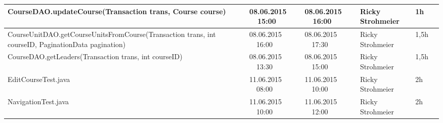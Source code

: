 \begin{landscape}
\begin{tabular}{|p{10.3cm}|p{3.2cm}|p{3.2cm}|p{3.5cm}|p{1.7cm}|p{1.5cm}|}
		\hline   CourseDAO.updateCourse(Transaction trans, Course course)   & 08.06.2015 \ \ 15:00       & 08.06.2015  \ \  16:00     & Ricky Strohmeier  &  1h              &\\
		\hline   CourseUnitDAO.getCourseUnitsFromCourse(Transaction trans, int courseID, PaginationData pagination) & 08.06.2015 \ \ 16:00       & 08.06.2015  \ \  17:30     & Ricky Strohmeier &  1,5h              &\\
		\hline   CourseDAO.getLeaders(Transaction trans, int courseID)    & 08.06.2015 \ \ 13:30       & 08.06.2015  \ \  15:00     & Ricky Strohmeier  &  1,5h              &\\
		\hline   EditCourseTest.java              & 11.06.2015 \ \ 08:00     & 11.06.2015 \ \ 10:00     & Ricky Strohmeier &      2h               &\\ 
		\hline   NavigationTest.java              & 11.06.2015 \ \ 10:00     & 11.06.2015 \ \ 12:00     & Ricky Strohmeier &      2h               &\\ 
		\hline 
	\end{tabular} \ \\
	\ \\
	

\end{landscape}
